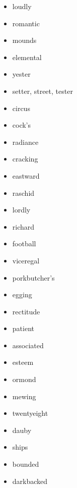 \documentclass{article}
\begin{document}
\begin{itemize}
    \item loudly
    \item romantic
    \item mounds
    \item elemental
    \item yester
    \item setter, street, tester
    \item circus
    \item cock's
    \item radiance
    \item cracking
    \item eastward
    \item raschid
    \item lordly
    \item richard
    \item football
    \item viceregal
    \item porkbutcher's
    \item egging
    \item rectitude
    \item patient
    \item associated
    \item esteem
    \item ormond
    \item mewing
    \item twentyeight
    \item dauby
    \item ships
    \item bounded
    \item darkbacked
\end{itemize}
\end{document}
